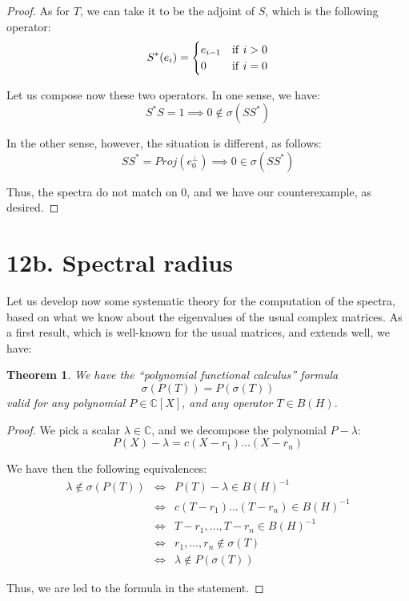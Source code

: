 \documentclass[12pt]{amsbook}
\newtheorem{theorem}{Theorem}[chapter]
\begin{document}
\begin{proof}
As for $T$, we can take it to be the adjoint of $S$, which is the following operator:
$$S^*(e_i)=\begin{cases}
e_{i-1}&{\rm if}\ i>0\\
0&{\rm if}\ i=0
\end{cases}$$

Let us compose now these two operators. In one sense, we have:
$$S^*S=1\implies 0\notin\sigma(SS^*)$$

In the other sense, however, the situation is different, as follows:
$$SS^*=Proj(e_0^\perp)\implies 0\in\sigma(SS^*)$$

Thus, the spectra do not match on $0$, and we have our counterexample, as desired.
\end{proof}

\section*{12b. Spectral radius}

Let us develop now some systematic theory for the computation of the spectra, based on what we know about the eigenvalues of the usual complex matrices. As a first result, which is well-known for the usual matrices, and extends well, we have:


\begin{theorem}
We have the ``polynomial functional calculus'' formula
$$\sigma(P(T))=P(\sigma(T))$$
valid for any polynomial $P\in\mathbb C[X]$, and any operator $T\in B(H)$.
\end{theorem}

\begin{proof}
We pick a scalar $\lambda\in\mathbb C$, and we decompose the polynomial $P-\lambda$:
$$P(X)-\lambda=c(X-r_1)\ldots(X-r_n)$$

We have then the following equivalences:
\begin{eqnarray*}
\lambda\notin\sigma(P(T))
&\iff&P(T)-\lambda\in B(H)^{-1}\\
&\iff&c(T-r_1)\ldots(T-r_n)\in B(H)^{-1}\\
&\iff&T-r_1,\ldots,T-r_n\in B(H)^{-1}\\
&\iff&r_1,\ldots,r_n\notin\sigma(T)\\
&\iff&\lambda\notin P(\sigma(T))
\end{eqnarray*}

Thus, we are led to the formula in the statement.
\end{proof}
\end{document}
